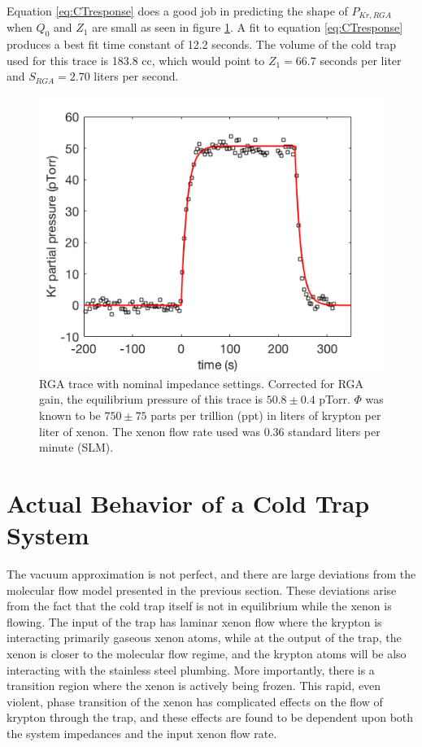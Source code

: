 \documentclass[12pt]{article}
\begin{document}
Equation \ref{eq:CTresponse} does a good job in predicting the shape of $P_{Kr,RGA}$ when $Q_0$ and $Z_1$ are small as seen in figure \ref{fig:RGAtrace_fast}. A fit to equation \ref{eq:CTresponse} produces a best fit time constant of 12.2 seconds. The volume of the cold trap used for this trace is 183.8 cc, which would point to $Z_1=66.7$ seconds per liter and $S_{RGA}=2.70$ liters per second. 
\begin{figure}[h!]
\centering
\includegraphics[width=\textwidth]{Figures/RGATrace_fit_fast.png}
\caption{RGA trace with nominal impedance settings. Corrected for RGA gain, the equilibrium pressure of this trace is $50.8 \pm 0.4$ pTorr. $\Phi$ was known to be $750 \pm 75$ parts per trillion (ppt) in liters of krypton per liter of xenon. The xenon flow rate used was 0.36 standard liters per minute (SLM). }
\label{fig:RGAtrace_fast}
\end{figure}





\section{Actual Behavior of a Cold Trap System}
The vacuum approximation is not perfect, and there are large deviations from the molecular flow model presented in the previous section. These deviations arise from the fact that the cold trap itself is not in equilibrium while the xenon is flowing. The input of the trap has laminar xenon flow where the krypton is interacting primarily gaseous xenon atoms, while at the output of the trap, the xenon is closer to the molecular flow regime, and the krypton atoms will be also interacting with the stainless steel plumbing. More importantly, there is a transition region where the xenon is actively being frozen. This rapid, even violent, phase transition of the xenon has complicated effects on the flow of krypton through the trap, and these effects are found to be dependent upon both the system impedances and the input xenon flow rate.
\end{document}
